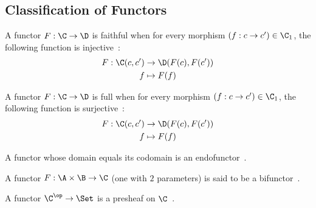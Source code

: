 \subsection{Classification of Functors}

\begin{definition}
  A functor $F:\C\to \D$ is faithful when for every morphism $(f: c\to c') \in
  \C_1$, the following function is
  injective~\parencite[p.~25]{leinster:basic_category_theory}:
    \[
      \begin{aligned}
        F: \C(c, c') &\to \D(F(c), F(c'))\\
        f &\mapsto F(f)
      \end{aligned}
    \]
\end{definition}

\begin{definition}
  A functor $F:\C\to \D$ is full when for every morphism $(f: c\to c') \in
  \C_1$, the following function is
  surjective~\parencite[p.~25]{leinster:basic_category_theory}:
  \[
    \begin{aligned}
      F: \C(c, c') &\to \D(F(c), F(c'))\\
      f &\mapsto F(f)
    \end{aligned}
  \]
\end{definition}

\begin{definition}
  A functor whose domain equals its codomain is an
  endofunctor~\parencite[p.~30]{adamek_herrlich_strecker:joy_cats}.
\end{definition}

\begin{definition}
  A functor $F:\A\times \B \to \C$ (one with $2$ parameters) is said to be a
  bifunctor~\parencite[p.~37]{lane:working_mathematician}.
\end{definition}

\begin{definition}
  A functor $\C^\op \to \Set$ is a presheaf on
  $\C$~\parencite[p.~24]{leinster:basic_category_theory}.
\end{definition}


